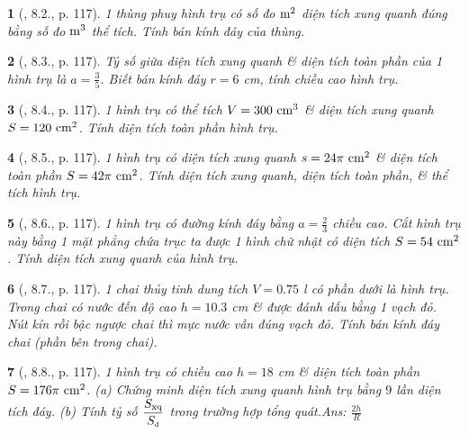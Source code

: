 \documentclass{article}
\newtheorem{baitoan}{}
\begin{document}
\begin{baitoan}[\cite{Binh_boi_duong_Toan_9_tap_2}, 8.2., p. 117]
	1 thùng phuy hình trụ có số đo $\rm m^2$ diện tích xung quanh đúng bằng số đo $\rm m^3$ thể tích. Tính bán kính đáy của thùng.
\end{baitoan}

\begin{baitoan}[\cite{Binh_boi_duong_Toan_9_tap_2}, 8.3., p. 117]
	Tỷ số giữa diện tích xung quanh \& diện tích toàn phần của 1 hình trụ là $a = \frac{3}{5}$. Biết bán kính đáy $r = 6$ {\rm cm}, tính chiều cao hình trụ.
\end{baitoan}

\begin{baitoan}[\cite{Binh_boi_duong_Toan_9_tap_2}, 8.4., p. 117]
	1 hình trụ có thể tích $V = 300\ {\rm cm}^3$ \& diện tích xung quanh $S = 120\ {\rm cm}^2$. Tính diện tích toàn phần hình trụ.
\end{baitoan}

\begin{baitoan}[\cite{Binh_boi_duong_Toan_9_tap_2}, 8.5., p. 117]
	1 hình trụ có diện tích xung quanh $s = 24\pi\ {\rm cm}^2$ \& diện tích toàn phần $S = 42\pi\ {\rm cm}^2$. Tính diện tích xung quanh, diện tích toàn phần, \& thể tích hình trụ.
\end{baitoan}

\begin{baitoan}[\cite{Binh_boi_duong_Toan_9_tap_2}, 8.6., p. 117]
	1 hình trụ có đường kính đáy bằng $a = \frac{2}{3}$ chiều cao. Cắt hình trụ này bằng 1 mặt phẳng chứa trục ta được 1 hình chữ nhật có diện tích $S = 54\ {\rm cm}^2$. Tính diện tích xung quanh của hình trụ.
\end{baitoan}

\begin{baitoan}[\cite{Binh_boi_duong_Toan_9_tap_2}, 8.7., p. 117]
	1 chai thủy tinh dung tích $V = 0.75$ {\rm l} có phần dưới là hình trụ. Trong chai có nước đến độ cao $h = 10.3$ {\rm cm} \& được đánh dấu bằng 1 vạch đỏ. Nút kín rồi bậc ngược chai thì mực nước vẫn đúng vạch đỏ. Tính bán kính đáy chai (phần bên trong chai).
\end{baitoan}

\begin{baitoan}[\cite{Binh_boi_duong_Toan_9_tap_2}, 8.8., p. 117]
	1 hình trụ có chiều cao $h = 18$ {\rm cm} \& diện tích toàn phần $S = 176\pi\ {\rm cm}^2$. (a) Chứng minh diện tích xung quanh hình trụ bằng $9$ lần diện tích đáy. (b) Tính tỷ số $\dfrac{S_{\rm xq}}{S_{\tiny\mbox{\rm đ}}}$ trong trường hợp tổng quát.\hfill{\sf Ans: $\frac{2h}{R}$}
\end{baitoan}
\end{document}
